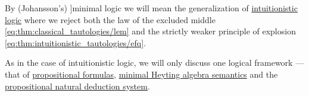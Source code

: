 \begin{definition}\label{def:minimal_logic}\mimprovised
  By (Johansson's) \term[en=minimal logic (\cite[1]{VanDerMolen2016}]{minimal logic} we will mean the generalization of \hyperref[def:intuitionistic_logic]{intuitionistic logic} where we reject both the law of the excluded middle \eqref{eq:thm:classical_tautologies/lem} and the strictly weaker principle of explosion \eqref{eq:thm:intuitionistic_tautologies/efq}.

  As in the case of intuitionistic logic, we will only discuss one logical framework --- that of \hyperref[def:propositional_syntax/formula]{propositional formulas}, \hyperref[def:minimal_propositional_semantics]{minimal Heyting algebra semantics} and the \hyperref[def:minimal_natural_deduction_system]{propositional natural deduction system}.
\end{definition}
